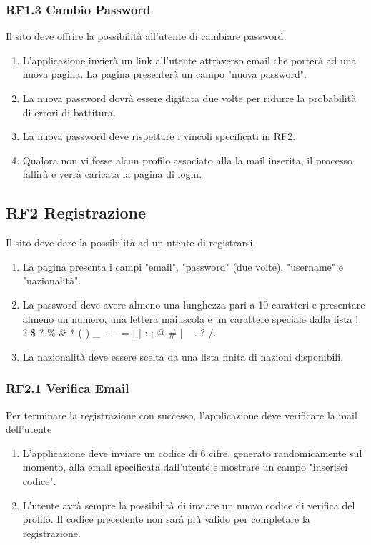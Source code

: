 \documentclass{report}
\begin{document}
\subsubsection*{RF1.3 Cambio Password}
Il sito deve offrire la possibilità all’utente di cambiare password.
	\begin{enumerate}
		\item L'applicazione invierà un link all'utente attraverso email che porterà ad una nuova pagina. La pagina presenterà un campo "nuova password".
		
		\item La nuova password dovrà essere digitata due volte per ridurre la probabilità di errori di battitura.
		
		\item La nuova password deve rispettare i vincoli specificati in RF2.
		
		\item Qualora non vi fosse alcun profilo associato alla la mail inserita, il processo fallirà e verrà caricata la pagina di login.
	\end{enumerate}


\subsection*{RF2 Registrazione}
Il sito deve dare la possibilità ad un utente di registrarsi.
\begin{enumerate}
	\item La pagina presenta i campi "email", "password" (due volte), "username" e "nazionalità". 
	\item La password deve avere almeno una lunghezza pari a 10 caratteri e presentare almeno un numero, una lettera maiuscola e un carattere speciale dalla lista ! ? \$ ? \% \^ \& * ( ) \_ - + = { [ } ] : ; @ \# | \ < , > . ? /. 
	\item La nazionalità deve essere scelta da una lista finita di nazioni disponibili.
\end{enumerate}

\subsubsection*{RF2.1 Verifica Email}
Per terminare la registrazione con successo, l'applicazione deve verificare la mail dell'utente

\begin{enumerate}
	\item L'applicazione deve inviare un codice di 6 cifre, generato randomicamente sul momento, alla email specificata dall’utente e mostrare un campo "inserisci codice".
		
	\item L’utente avrà sempre la possibilità di inviare un nuovo codice di verifica del profilo. Il codice precedente non sarà più valido per completare la registrazione.
		
\end{enumerate}
\end{document}
